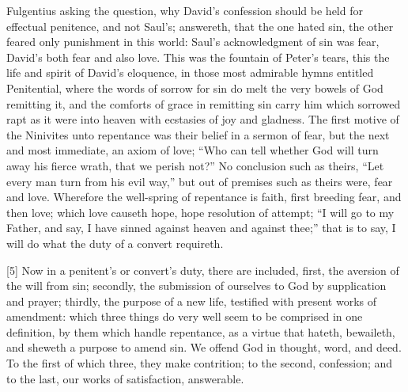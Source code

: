 Fulgentius asking the question, why David’s confession should be held for effectual penitence, and not Saul’s; answereth, that the one hated sin, the other feared only punishment in this world: Saul’s acknowledgment of sin was fear, David’s both fear and also love. This was the fountain of Peter’s tears, this the life and spirit of David’s eloquence, in those most admirable hymns entitled Penitential, where the words of sorrow for sin do melt the very bowels of God remitting it, and the comforts of grace in remitting sin carry him which sorrowed rapt as it were into heaven with ecstasies of joy and gladness. The first motive of the Ninivites unto repentance was their belief in a sermon of fear, but the next and most immediate, an axiom of love; “Who can tell whether God will turn away his fierce wrath, that we perish not?” No conclusion such as theirs, “Let every man turn from his evil way,” but out of premises such as theirs were, fear and love. Wherefore the well-spring of repentance is faith, first breeding fear, and then love; which love causeth hope, hope resolution of attempt; “I will go to my Father, and say, I have sinned against heaven and against thee;” that is to say, I will do what the duty of a convert requireth.

[5] Now in a penitent’s or convert’s duty, there are included, first, the aversion of the will from sin; secondly, the submission of ourselves to God by supplication and prayer; thirdly, the purpose of a new life, testified with present works of amendment: which three things do very well seem to be comprised in one definition, by them which handle repentance, as a virtue that hateth, bewaileth, and sheweth a purpose to amend sin. We offend God in thought, word, and deed. To the first of which three, they make contrition; to the second, confession; and to the last, our works of satisfaction, answerable.

